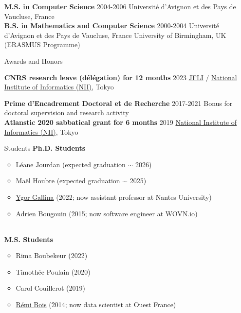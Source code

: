 \documentclass[11pt,a4paper]{article}
\begin{document}
\begin{itemize}
\textbf{M.S. in Computer Science} \hfill 2004-2006 \newline 
Université d'Avignon et des Pays de Vaucluse, France \\[-.5cm]
                    
\textbf{B.S. in Mathematics and Computer Science} \hfill 2000-2004 \newline
Université d'Avignon et des Pays de Vaucluse, France \newline
University of Birmingham, UK (ERASMUS Programme)

\item[Awards and Honors]

\textbf{CNRS research leave (délégation) for 12 months} \hfill 2023 \newline
\href{https://jfli.cnrs.fr/}{JFLI} /
\href{https://www.nii.ac.jp/en/}{National Institute of Informatics (NII)}, Tokyo

\textbf{Prime d'Encadrement Doctoral et de Recherche} \hfill 2017-2021 \newline
Bonus for doctoral supervision and research activity \\[-.5cm]

\textbf{Atlanstic 2020 sabbatical grant for 6 months} \hfill 2019 \newline
\href{https://www.nii.ac.jp/en/}{National Institute of Informatics (NII)}, Tokyo




\item[Students]
\textbf{Ph.D. Students}
\begin{itemize}[nosep,topsep=-0.2cm,leftmargin=!,labelsep*=.3cm,label=$\Yright$]
\item Léane Jourdan (expected graduation $\sim$ 2026) 
\item Maël Houbre (expected graduation $\sim$ 2025)
\item \href{https://github.com/ygorg}{Ygor Gallina}
      (2022; now assistant professor at Nantes University) 
\item \href{http://adrien-bougouin.github.io/}{Adrien Bougouin} 
      (2015; now software engineer at \href{https://wovn.io/}{WOVN.io}) 
\end{itemize}~\\[-.2cm]
%
\textbf{M.S. Students}
\begin{itemize}[nosep,topsep=-0.2cm,leftmargin=!,labelsep*=.3cm,label=$\Yright$]
\item Rima Boubekeur (2022)
\item Timothée Poulain (2020)
\item Carol Couillerot (2019)
\item \href{https://www.ledatablog.com/}{Rémi Bois} (2014; now data scientist at Ouest France) 
\end{itemize}


\end{itemize}
\end{document}

